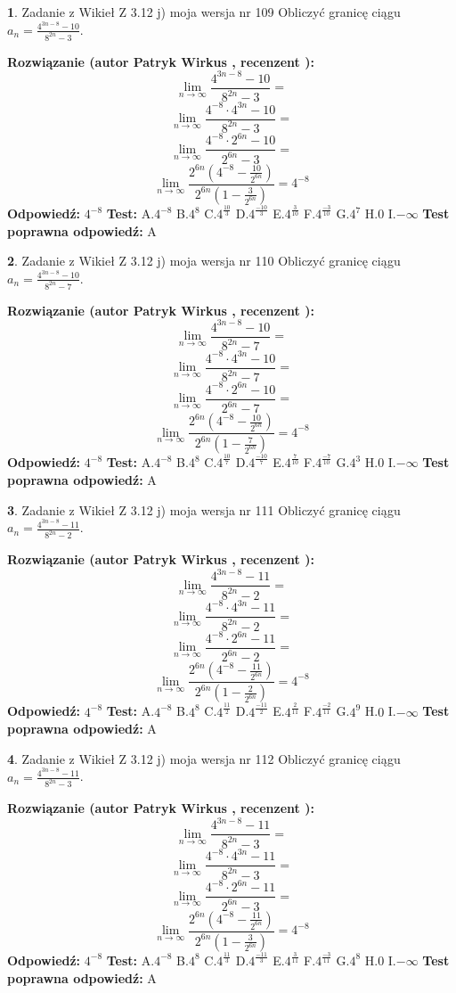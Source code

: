 \documentclass[12pt, a4paper]{article}
\theoremstyle{definition} %
\newtheorem{zad}{}
\newcommand{\zadStart}[1]{\begin{zad}#1\newline}
\newcommand{\zadStop}{\end{zad}}
\newcommand{\rozwStart}[2]{\noindent \textbf{Rozwiązanie (autor #1 , recenzent #2): }\newline}
\newcommand{\rozwStop}{\newline}
\newcommand{\odpStart}{\noindent \textbf{Odpowiedź:}\newline}
\newcommand{\odpStop}{\newline}
\newcommand{\testStart}{\noindent \textbf{Test:}\newline}
\newcommand{\testStop}{\newline}
\newcommand{\kluczStart}{\noindent \textbf{Test poprawna odpowiedź:}\newline}
\newcommand{\kluczStop}{\newline}
\begin{document}
\zadStart{Zadanie z Wikieł Z 3.12 j) moja wersja nr 109}
Obliczyć granicę ciągu $a_{n}=\frac{4^{3n-8}-10}{8^{2n}-3}$.
\zadStop
\rozwStart{Patryk Wirkus}{}
$$\lim\limits_{n\to\infty}\frac{4^{3n-8}-10}{8^{2n}-3}=$$
$$\lim\limits_{n\to\infty}\frac{4^{-8} \cdot 4^{3n}-10}{8^{2n}-3}=$$
$$\lim\limits_{n\to\infty}\frac{4^{-8} \cdot 2^{6n}-10}{2^{6n}-3}=$$
$$\lim\limits_{n\to\infty}\frac{2^{6n}(4^{-8} - \frac{10}{2^{6n}})}{2^{6n}(1-\frac{3}{2^{6n}})}= 4^{-8}$$
\rozwStop
\odpStart
$4^{-8}$
\odpStop
\testStart
A.$4^{-8}$
B.$4^{8}$
C.$4^{\frac{10}{3}}$
D.$4^{\frac{-10}{3}}$
E.$4^{\frac{3}{10}}$
F.$4^{\frac{-3}{10}}$
G.$4^{7}$
H.$0$
I.$-\infty$
\testStop
\kluczStart
A
\kluczStop



\zadStart{Zadanie z Wikieł Z 3.12 j) moja wersja nr 110}
Obliczyć granicę ciągu $a_{n}=\frac{4^{3n-8}-10}{8^{2n}-7}$.
\zadStop
\rozwStart{Patryk Wirkus}{}
$$\lim\limits_{n\to\infty}\frac{4^{3n-8}-10}{8^{2n}-7}=$$
$$\lim\limits_{n\to\infty}\frac{4^{-8} \cdot 4^{3n}-10}{8^{2n}-7}=$$
$$\lim\limits_{n\to\infty}\frac{4^{-8} \cdot 2^{6n}-10}{2^{6n}-7}=$$
$$\lim\limits_{n\to\infty}\frac{2^{6n}(4^{-8} - \frac{10}{2^{6n}})}{2^{6n}(1-\frac{7}{2^{6n}})}= 4^{-8}$$
\rozwStop
\odpStart
$4^{-8}$
\odpStop
\testStart
A.$4^{-8}$
B.$4^{8}$
C.$4^{\frac{10}{7}}$
D.$4^{\frac{-10}{7}}$
E.$4^{\frac{7}{10}}$
F.$4^{\frac{-7}{10}}$
G.$4^{3}$
H.$0$
I.$-\infty$
\testStop
\kluczStart
A
\kluczStop



\zadStart{Zadanie z Wikieł Z 3.12 j) moja wersja nr 111}
Obliczyć granicę ciągu $a_{n}=\frac{4^{3n-8}-11}{8^{2n}-2}$.
\zadStop
\rozwStart{Patryk Wirkus}{}
$$\lim\limits_{n\to\infty}\frac{4^{3n-8}-11}{8^{2n}-2}=$$
$$\lim\limits_{n\to\infty}\frac{4^{-8} \cdot 4^{3n}-11}{8^{2n}-2}=$$
$$\lim\limits_{n\to\infty}\frac{4^{-8} \cdot 2^{6n}-11}{2^{6n}-2}=$$
$$\lim\limits_{n\to\infty}\frac{2^{6n}(4^{-8} - \frac{11}{2^{6n}})}{2^{6n}(1-\frac{2}{2^{6n}})}= 4^{-8}$$
\rozwStop
\odpStart
$4^{-8}$
\odpStop
\testStart
A.$4^{-8}$
B.$4^{8}$
C.$4^{\frac{11}{2}}$
D.$4^{\frac{-11}{2}}$
E.$4^{\frac{2}{11}}$
F.$4^{\frac{-2}{11}}$
G.$4^{9}$
H.$0$
I.$-\infty$
\testStop
\kluczStart
A
\kluczStop



\zadStart{Zadanie z Wikieł Z 3.12 j) moja wersja nr 112}
Obliczyć granicę ciągu $a_{n}=\frac{4^{3n-8}-11}{8^{2n}-3}$.
\zadStop
\rozwStart{Patryk Wirkus}{}
$$\lim\limits_{n\to\infty}\frac{4^{3n-8}-11}{8^{2n}-3}=$$
$$\lim\limits_{n\to\infty}\frac{4^{-8} \cdot 4^{3n}-11}{8^{2n}-3}=$$
$$\lim\limits_{n\to\infty}\frac{4^{-8} \cdot 2^{6n}-11}{2^{6n}-3}=$$
$$\lim\limits_{n\to\infty}\frac{2^{6n}(4^{-8} - \frac{11}{2^{6n}})}{2^{6n}(1-\frac{3}{2^{6n}})}= 4^{-8}$$
\rozwStop
\odpStart
$4^{-8}$
\odpStop
\testStart
A.$4^{-8}$
B.$4^{8}$
C.$4^{\frac{11}{3}}$
D.$4^{\frac{-11}{3}}$
E.$4^{\frac{3}{11}}$
F.$4^{\frac{-3}{11}}$
G.$4^{8}$
H.$0$
I.$-\infty$
\testStop
\kluczStart
A
\kluczStop
\end{document}

